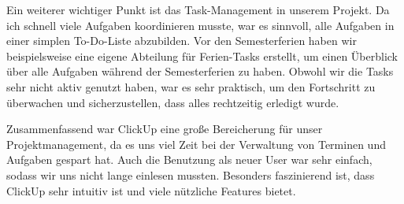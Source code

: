 Ein weiterer wichtiger Punkt ist das Task-Management in
unserem Projekt. Da ich schnell viele Aufgaben koordinieren
musste, war es sinnvoll, alle Aufgaben in einer simplen
To-Do-Liste abzubilden. Vor den Semesterferien haben wir
beispielsweise eine eigene Abteilung für Ferien-Tasks
erstellt, um einen Überblick über alle Aufgaben während der
Semesterferien zu haben. Obwohl wir die Tasks sehr nicht
aktiv genutzt haben, war es sehr praktisch, um den
Fortschritt zu überwachen und sicherzustellen, dass alles
rechtzeitig erledigt wurde.

Zusammenfassend war ClickUp eine große Bereicherung für unser Projektmanagement, da es uns viel Zeit bei der Verwaltung von Terminen und Aufgaben gespart hat. Auch die Benutzung als neuer User war sehr einfach, sodass wir uns nicht lange einlesen mussten. Besonders faszinierend ist, dass ClickUp sehr intuitiv ist und viele nützliche Features bietet.


